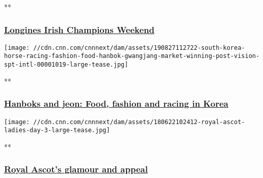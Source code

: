 **

\hypertarget{longines-irish-champions-weekend}{%
\subsubsection{\texorpdfstring{\href{/videos/sports/2019/09/12/longines-irish-champions-weekend-leopardstown-curragh-vision-spt-intl-lon-orig.cnn}{Longines
Irish Champions
Weekend}}{Longines Irish Champions Weekend}}\label{longines-irish-champions-weekend}}

\href{/videos/sports/2019/08/27/south-korea-horse-racing-fashion-food-hanbok-gwangjang-market-winning-post-vision-spt-intl.cnn}{}

\texttt{[image: //cdn.cnn.com/cnnnext/dam/assets/190827112722-south-korea-horse-racing-fashion-food-hanbok-gwangjang-market-winning-post-vision-spt-intl-00001019-large-tease.jpg]}

**

\hypertarget{hanboks-and-jeon-food-fashion-and-racing-in-korea}{%
\subsubsection{\texorpdfstring{\href{/videos/sports/2019/08/27/south-korea-horse-racing-fashion-food-hanbok-gwangjang-market-winning-post-vision-spt-intl.cnn}{Hanboks
and jeon: Food, fashion and racing in
Korea}}{Hanboks and jeon: Food, fashion and racing in Korea}}\label{hanboks-and-jeon-food-fashion-and-racing-in-korea}}

\href{/videos/sports/2019/06/17/royal-ascot-explainer-glamour-glitz-queen-elizabeth-ii-winning-post-spt-intl-lon-orig-gbr.cnn}{}

\texttt{[image: //cdn.cnn.com/cnnnext/dam/assets/180622102412-royal-ascot-ladies-day-3-large-tease.jpg]}

**

\hypertarget{royal-ascots-glamour-and-appeal}{%
\subsubsection{\texorpdfstring{\href{/videos/sports/2019/06/17/royal-ascot-explainer-glamour-glitz-queen-elizabeth-ii-winning-post-spt-intl-lon-orig-gbr.cnn}{Royal
Ascot's glamour and
appeal}}{Royal Ascot's glamour and appeal}}\label{royal-ascots-glamour-and-appeal}}

\href{/videos/sports/2019/05/17/bob-baffert-horse-trainer-kentucky-derby-triple-crown-silver-charm-winning-post-vision-spt-intl.cnn}{}

